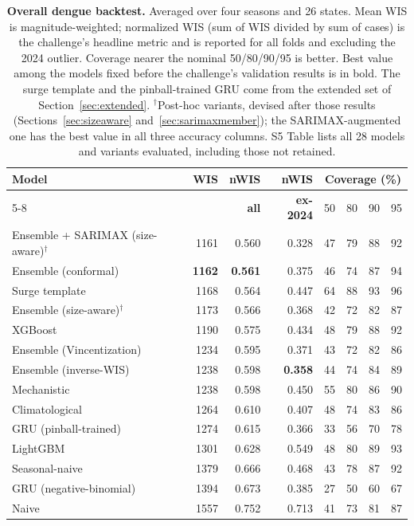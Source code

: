 \documentclass[11pt]{article}
\begin{document}
\begin{table}[t]
\centering\small
\caption{\textbf{Overall dengue backtest.} Averaged over four seasons and 26 states. Mean WIS is
magnitude-weighted; normalized WIS (sum of WIS divided by sum of cases) is the challenge's headline
metric and is reported for all folds and excluding the 2024 outlier. Coverage nearer the nominal
50/80/90/95 is better. Best value among the models fixed before the challenge's validation
results is in bold. The surge template and the pinball-trained GRU come from the extended set of
Section~\ref{sec:extended}. $^\dagger$Post-hoc variants, devised after those results
(Sections~\ref{sec:sizeaware} and~\ref{sec:sarimaxmember}); the SARIMAX-augmented one has the best
value in all three accuracy columns. S5 Table lists all 28 models and variants evaluated, including
those not retained.}
\label{tab:leaderboard}
\begin{tabular}{@{}lrrrcccc@{}}
\toprule
\textbf{Model} & \textbf{WIS} & \textbf{nWIS} & \textbf{nWIS} & \multicolumn{4}{c}{\textbf{Coverage (\%)}} \\
\cmidrule(l){5-8}
 & & \textbf{all} & \textbf{ex-2024} & 50 & 80 & 90 & 95 \\
\midrule
Ensemble + SARIMAX (size-aware)$^\dagger$ & 1161 & 0.560 & 0.328 & 47 & 79 & 88 & 92 \\
Ensemble (conformal)      & \textbf{1162} & \textbf{0.561} & 0.375 & 46 & 74 & 87 & 94 \\
Surge template            & 1168 & 0.564 & 0.447 & 64 & 88 & 93 & 96 \\
Ensemble (size-aware)$^\dagger$ & 1173 & 0.566 & 0.368 & 42 & 72 & 82 & 87 \\
XGBoost                   & 1190 & 0.575 & 0.434 & 48 & 79 & 88 & 92 \\
Ensemble (Vincentization) & 1234 & 0.595 & 0.371 & 43 & 72 & 82 & 86 \\
Ensemble (inverse-WIS)    & 1238 & 0.598 & \textbf{0.358} & 44 & 74 & 84 & 89 \\
Mechanistic               & 1238 & 0.598 & 0.450 & 55 & 80 & 86 & 90 \\
Climatological            & 1264 & 0.610 & 0.407 & 48 & 74 & 83 & 86 \\
GRU (pinball-trained)     & 1274 & 0.615 & 0.366 & 33 & 56 & 70 & 78 \\
LightGBM                  & 1301 & 0.628 & 0.549 & 48 & 80 & 89 & 93 \\
Seasonal-naive            & 1379 & 0.666 & 0.468 & 43 & 78 & 87 & 92 \\
GRU (negative-binomial)   & 1394 & 0.673 & 0.385 & 27 & 50 & 60 & 67 \\
Naive                     & 1557 & 0.752 & 0.713 & 41 & 73 & 81 & 87 \\
\bottomrule
\end{tabular}
\end{table}
\end{document}
